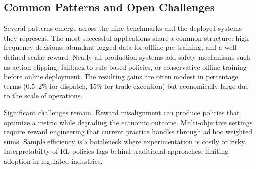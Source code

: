 \subsection{Common Patterns and Open Challenges}
\label{sec:benchmark_patterns}

Several patterns emerge across the nine benchmarks and the deployed systems they represent. The most successful applications share a common structure: high-frequency decisions, abundant logged data for offline pre-training, and a well-defined scalar reward. Nearly all production systems add safety mechanisms such as action clipping, fallback to rule-based policies, or conservative offline training before online deployment. The resulting gains are often modest in percentage terms ($0.5$--$2\%$ for dispatch, $15\%$ for trade execution) but economically large due to the scale of operations.

Significant challenges remain. Reward misalignment can produce policies that optimize a metric while degrading the economic outcome. Multi-objective settings require reward engineering that current practice handles through ad hoc weighted sums. Sample efficiency is a bottleneck where experimentation is costly or risky. Interpretability of RL policies lags behind traditional approaches, limiting adoption in regulated industries.

